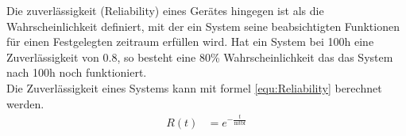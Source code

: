 Die zuverlässigkeit (Reliability) eines Gerätes hingegen ist als die Wahrscheinlichkeit definiert, mit der ein System seine beabsichtigten Funktionen für einen Festgelegten zeitraum erfüllen wird. Hat ein System bei 100h eine Zuverlässigkeit von 0.8, so besteht eine 80\% Wahrscheinlichkeit das das System nach 100h noch funktioniert.\cite{MTBFReliability}\\
Die Zuverlässigkeit eines Systems kann mit formel \ref{equ:Reliability} berechnet werden. 
\begin{align}
    && R(t) &= e^{-\frac{t}{\text{mtbf}}} &&
    \label{equ:Reliability} 
\end{align}
